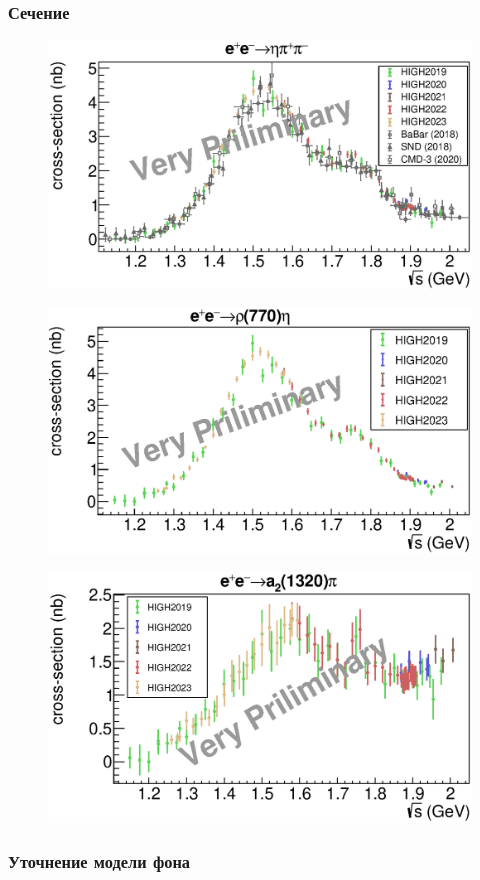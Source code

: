 \documentclass{beamer}
\begin{document}
\begin{frame}
  \frametitle{Сечение}
  \begin{minipage}[t]{0.48\linewidth}
    \begin{figure}
      \includegraphics[width=\linewidth]{figures/bcs_etapipi.eps}
    \end{figure}
  \end{minipage}
  \begin{minipage}[t]{0.48\linewidth}
    \begin{figure}
      \includegraphics[width=\linewidth]{figures/bcs_partial_rhoeta.eps}
    \end{figure}
  \end{minipage}
  \begin{minipage}[t]{0.48\linewidth}
    \begin{figure}
      \includegraphics[width=\linewidth]{figures/bcs_partial_a2pi.eps}
    \end{figure}
  \end{minipage}
\end{frame}

\begin{frame}
  \frametitle{Уточнение модели фона}
\end{frame}
\end{document}
